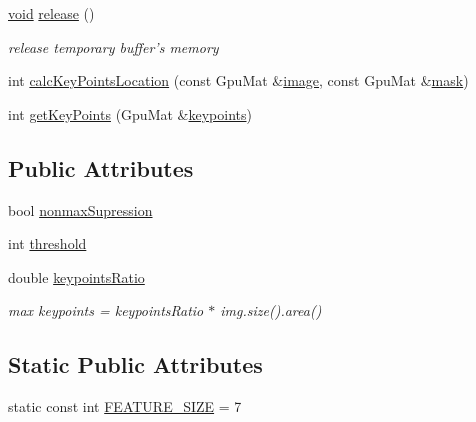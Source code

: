 \begin{DoxyCompactItemize}
\hyperlink{legacy_8hpp_a8bb47f092d473522721002c86c13b94e}{void} \hyperlink{classcv_1_1gpu_1_1FAST__GPU_a917e84e4f007779c70be297304cdb13e}{release} ()
\begin{DoxyCompactList}\small\item\em release temporary buffer's memory \end{DoxyCompactList}\item 
int \hyperlink{classcv_1_1gpu_1_1FAST__GPU_a03ff70a004c7e7b9b1a49363d39f2023}{calc\-Key\-Points\-Location} (const Gpu\-Mat \&\hyperlink{legacy_8hpp_ad62b16ab219ae2483e8a3d921c44cc97}{image}, const Gpu\-Mat \&\hyperlink{tracking_8hpp_a6b13ecd2fd6ec7ad422f1d7863c3ad19}{mask})
\item 
int \hyperlink{classcv_1_1gpu_1_1FAST__GPU_a8570b1287cd018abb17bb304e369c833}{get\-Key\-Points} (Gpu\-Mat \&\hyperlink{compat_8hpp_af95b6678bbbdd664ed15fe6d4190d355}{keypoints})
\end{DoxyCompactItemize}
\subsection*{Public Attributes}
\begin{DoxyCompactItemize}
\item 
bool \hyperlink{classcv_1_1gpu_1_1FAST__GPU_a73b328bc50cd60cec18f85bea59dff1c}{nonmax\-Supression}
\item 
int \hyperlink{classcv_1_1gpu_1_1FAST__GPU_a28b49bef52f11f2c366bf9167c52d985}{threshold}
\item 
double \hyperlink{classcv_1_1gpu_1_1FAST__GPU_a82f6122d0207b098068279d6fd75b973}{keypoints\-Ratio}
\begin{DoxyCompactList}\small\item\em max keypoints = keypoints\-Ratio $\ast$ img.\-size().area() \end{DoxyCompactList}\end{DoxyCompactItemize}
\subsection*{Static Public Attributes}
\begin{DoxyCompactItemize}
\item 
static const int \hyperlink{classcv_1_1gpu_1_1FAST__GPU_ae2e204176ed9664ca078b5bd1891176f}{F\-E\-A\-T\-U\-R\-E\-\_\-\-S\-I\-Z\-E} = 7
\end{DoxyCompactItemize}


